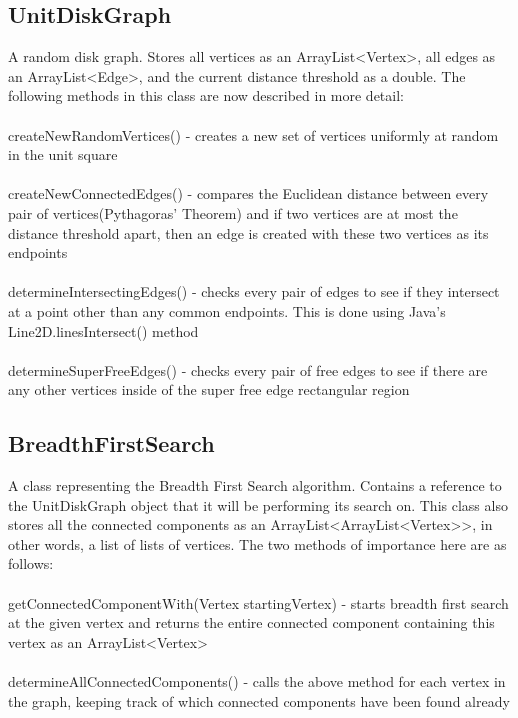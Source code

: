 \documentclass{article}
\begin{document}
\subsection*{UnitDiskGraph}
A random disk graph. Stores all vertices as an ArrayList\textless Vertex\textgreater, all edges as an ArrayList\textless Edge\textgreater, and the current distance threshold as a double. The following methods in this class are now described in more detail:\\ \\
createNewRandomVertices() - creates a new set of vertices uniformly at random in the unit square\\ \\
createNewConnectedEdges() - compares the Euclidean distance between every pair of vertices(Pythagoras' Theorem) and if two vertices are at most the distance threshold apart, then an edge is created with these two vertices as its endpoints\\ \\
determineIntersectingEdges() - checks every pair of edges to see if they intersect at a point other than any common endpoints. This is done using Java's Line2D.linesIntersect() method\\ \\
determineSuperFreeEdges() - checks every pair of free edges to see if there are any other vertices inside of the super free edge rectangular region

\subsection*{BreadthFirstSearch}
A class representing the Breadth First Search algorithm. Contains a reference to the UnitDiskGraph object that it will be performing its search on. This class also stores all the connected components as an ArrayList\textless ArrayList\textless Vertex\textgreater\textgreater, in other words, a list of lists of vertices. The two methods of importance here are as follows:\\ \\
getConnectedComponentWith(Vertex startingVertex) - starts breadth first search at the given vertex and returns the entire connected component containing this vertex as an ArrayList\textless Vertex\textgreater \\ \\
determineAllConnectedComponents() - calls the above method for each vertex in the graph, keeping track of which connected components have been found already
\end{document}
